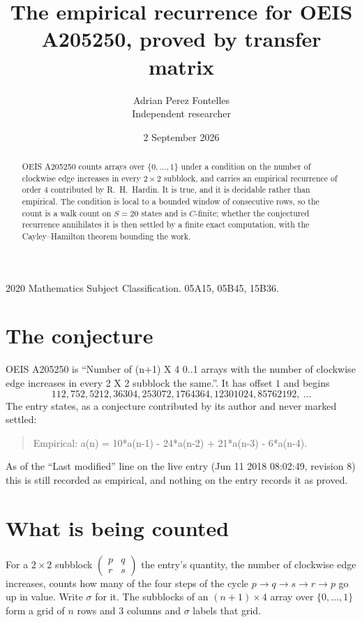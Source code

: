 \documentclass[11pt,a4paper]{article}
\title{The empirical recurrence for OEIS A205250, proved by transfer matrix}
\author{Adrian Perez Fontelles\\ \small Independent researcher}
\date{2 September 2026}
\theoremstyle{plain}
\theoremstyle{definition}
\begin{document}
\maketitle

\begin{abstract}
OEIS A205250 counts arrays over $\{0,\dots,1\}$ under a condition on the number of clockwise edge increases
in every $2\times2$ subblock, and carries an empirical recurrence of order $4$ contributed by
R.~H.~Hardin. It is true, and it is decidable rather than empirical. The condition is local to
a bounded window of consecutive rows, so the count is a walk count on $S=20$ states and is
$C$-finite; whether the conjectured recurrence annihilates it is then settled by a finite exact
computation, with the Cayley--Hamilton theorem bounding the work.
\end{abstract}

\noindent\small 2020 Mathematics Subject Classification. 05A15, 05B45, 15B36.\normalsize

\section{The conjecture}

OEIS A205250 is ``Number of (n+1) X 4 0..1 arrays with the number of clockwise edge increases in every 2 X 2 subblock the same.''. It has offset $1$ and begins
\[
112, 752, 5212, 36304, 253072, 1764364, 12301024, 85762192,\ \dots
\]
The entry states, as a conjecture contributed by its author and never marked settled:
\begin{quote}
Empirical: a(n) = 10*a(n-1) - 24*a(n-2) + 21*a(n-3) - 6*a(n-4).
\end{quote}
As of the ``Last modified'' line on the live entry (Jun 11 2018 08:02:49, revision 8) this is still
recorded as empirical, and nothing on the entry records it as proved.

\section{What is being counted}

For a $2\times2$ subblock $\begin{pmatrix}p&q\\r&s\end{pmatrix}$ the
entry's quantity, the number of clockwise edge increases, counts how many of the four steps of the cycle $p\to q\to s\to r\to p$ go up in value. Write $\sigma$ for it. The subblocks of an
$(n+1)\times4$ array over $\{0,\dots,1\}$ form a grid of $n$ rows and $3$
columns and $\sigma$ labels that grid.
\end{document}

